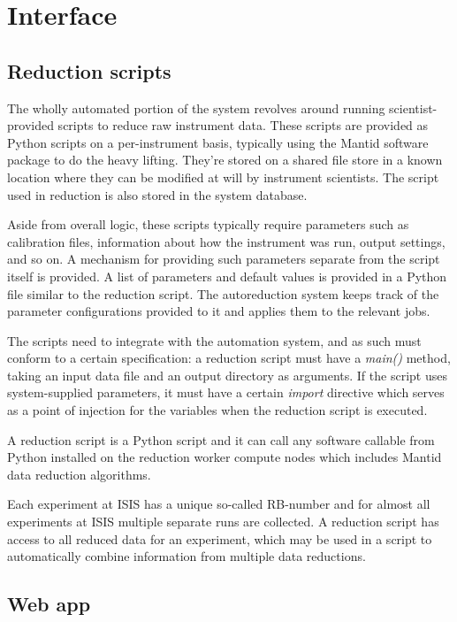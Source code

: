 \documentclass[twocolumn]{article}
\begin{document}
\section{Interface}\label{interface}

\subsection{Reduction scripts}\label{reduction-scripts}

The wholly automated portion of the system revolves around running
scientist-provided scripts to reduce raw instrument data. These scripts
are provided as Python scripts on a per-instrument basis, typically
using the Mantid software package to do the heavy lifting. They're
stored on a shared file store in a known location where they can be
modified at will by instrument scientists. The script used in
reduction is also stored in the system database.

Aside from overall logic, these scripts typically require parameters
such as calibration files, information about how the instrument was run,
output settings, and so on. A mechanism for providing such parameters 
separate from the script itself is provided. A list of parameters and
default values is provided in a Python file similar to the reduction
script. The autoreduction system keeps track of the parameter
configurations provided to it and applies them to the relevant jobs.

The scripts need to integrate with the automation system, and
as such must conform to a certain specification: a reduction script must have a
\emph{main()} method, taking an input data file and an output directory as
arguments. If the script uses system-supplied parameters, it must have a
certain \emph{import} directive which serves as a point of injection
for the variables when the reduction script is executed.

A reduction script is a Python script and it can call any software 
callable from Python installed on the reduction worker compute nodes which
includes Mantid data reduction algorithms.

Each experiment at ISIS has a unique so-called RB-number
and for almost all experiments at ISIS multiple separate runs are collected.
A reduction script has access to all reduced data for an experiment, which 
may be used in a script to automatically combine information from multiple 
data reductions.

\subsection{Web app}\label{web-app}
\end{document}
